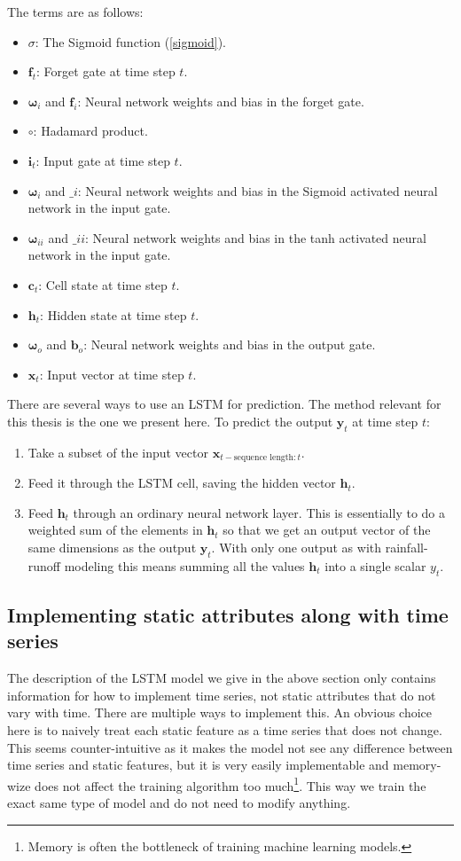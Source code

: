 The terms are as follows:
\begin{itemize}
    \item $\sigma$: The Sigmoid function (\ref{sigmoid}).
    \item $\bm{f}_t$: Forget gate at time step $t$.
    \item $\bm{\omega}_i$ and $\bm{f}_i$: Neural network weights and bias in the forget gate.
    \item $\circ$: Hadamard product.
    \item $\bm{i}_t$: Input gate at time step $t$.
    \item $\bm{\omega}_i$ and $\bm_i$: Neural network weights and bias in the Sigmoid activated neural network in the input gate.
    \item $\bm{\omega}_{ii}$ and $\bm_{ii}$: Neural network weights and bias in the tanh activated neural network in the input gate.
    \item $\bm{c}_t$: Cell state at time step $t$.
    \item $\bm{h}_t$: Hidden state at time step $t$.
    \item $\bm{\omega}_o$ and $\bm{b}_o$: Neural network weights and bias in the output gate.
    \item $\bm{x}_t$: Input vector at time step $t$.
\end{itemize}
There are several ways to use an LSTM for prediction. The method relevant for this 
thesis is the one we present here.
To predict the output $\bm{y}_t$ at time step $t$:
\begin{enumerate}
    \item Take a subset of the input vector $\bm{x}_{t-\text{sequence length}:t}$.
    \item Feed it through the LSTM cell, saving the hidden vector $\bm{h}_t$.
    \item Feed $\bm{h}_t$ through an ordinary neural network layer. This is essentially to do a weighted sum of the elements in $\bm{h}_t$ so that we get an output vector of the same dimensions as the output $\bm{y}_t$. With only one output as with rainfall-runoff modeling this means summing all the values $\bm{h}_t$ into a single scalar $y_t$.
\end{enumerate}
\subsection{Implementing static attributes along with time series}
The description of the LSTM model we give in the above section only contains information 
for how to implement time series, not static attributes that do not vary 
with time. There are multiple ways to implement this. An obvious choice here is to 
naively treat each static feature as a time series that does not change. This seems 
counter-intuitive as it makes the model not see any difference between time series and 
static features, but it is very easily implementable and memory-wize does not affect 
the training algorithm too much\footnote{Memory is often the bottleneck of training 
machine learning models. \citationneeded}. This way we train the exact same type 
of model and do not need to modify anything.

